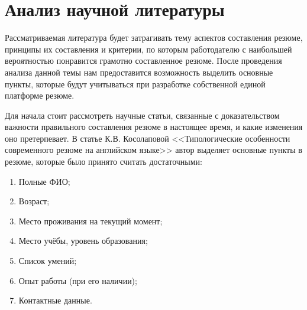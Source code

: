 \documentclass[master, och, diploma]{SCWorks}
\begin{document}
\newpage
\section{Анализ научной литературы}
Рассматриваемая литература будет затрагивать тему аспектов составления резюме, принципы их составления и критерии, по которым работодателю с наибольшей вероятностью понравится грамотно составленное резюме. После проведения анализа данной темы нам предоставится возможность выделить основные пункты, которые будут учитываться при разработке собственной единой платформе резюме.

Для начала стоит рассмотреть научные статьи, связанные с доказательством важности правильного составления резюме в настоящее время, и какие изменения  оно претерпевает. В статье К.В. Косолаповой <<Типологические особенности современного резюме на английском языке>> автор выделяет основные пункты в резюме, которые было принято считать достаточными:
\begin{enumerate}
    \item Полные ФИО;
    \item Возраст;
    \item Место проживания на текущий момент;
    \item Место учёбы, уровень образования;
    \item Список умений;
    \item Опыт работы (при его наличии);
    \item Контактные данные.
\end{enumerate}
\end{document}
